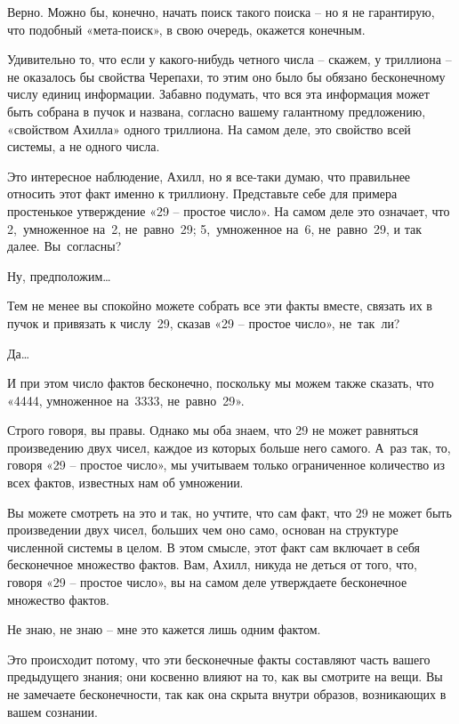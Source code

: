 \documentclass[../main.tex]{subfiles}
\begin{document}
\begin{dialogue}
 Верно. Можно бы, конечно, начать поиск такого поиска \--- но я не гарантирую, что подобный «мета-поиск», в свою очередь, окажется конечным.

 Удивительно то, что если у какого-нибудь четного числа \--- скажем, у триллиона \--- не оказалось бы свойства Черепахи, то этим оно было бы обязано бесконечному числу единиц информации. Забавно подумать, что вся эта информация может быть собрана в пучок и названа, согласно вашему галантному предложению, «свойством Ахилла» одного триллиона. На самом деле, это свойство всей системы, а не одного числа.

 Это интересное наблюдение, Ахилл, но я все-таки думаю, что правильнее относить этот факт именно к триллиону. Представьте себе для примера простенькое утверждение «29 \--- простое число». На самом деле это означает, что 2,~умноженное на~2, не~равно~29; 5,~умноженное на~6, не~равно~29, и так далее. Вы~согласны?

 Ну, предположим\ldots{}

 Тем не менее вы спокойно можете собрать все эти факты вместе, связать их в пучок и привязать к числу~29, сказав «29 \--- простое число», не~так~ли?

 Да\ldots{}

 И при этом число фактов бесконечно, поскольку мы можем также сказать, что «4444, умноженное на~3333, не~равно~29».

 Строго говоря, вы правы. Однако мы оба знаем, что 29 не может равняться произведению двух чисел, каждое из которых больше него самого. А~раз так, то, говоря «29 \--- простое число», мы учитываем только ограниченное количество из всех фактов, известных нам об умножении.

 Вы можете смотреть на это и так, но учтите, что сам факт, что 29 не может быть произведении двух чисел, больших чем оно само, основан на структуре численной системы в целом. В этом смысле, этот факт сам включает в себя бесконечное множество фактов. Вам, Ахилл, никуда не деться от того, что, говоря «29 \--- простое число», вы на самом деле утверждаете бесконечное множество фактов.

 Не знаю, не знаю \--- мне это кажется лишь одним фактом.

 Это происходит потому, что эти бесконечные факты составляют часть вашего предыдущего знания; они косвенно влияют на то, как вы смотрите на вещи. Вы не замечаете бесконечности, так как она скрыта внутри образов, возникающих в вашем сознании.


\end{dialogue}
\end{document}
